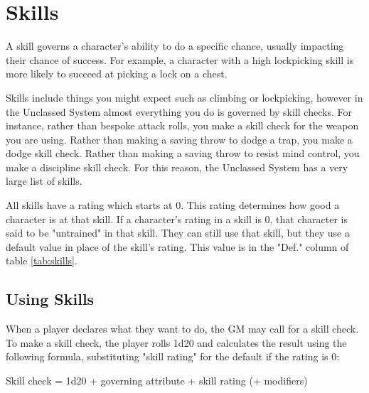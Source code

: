 \chapter{Skills}\label{skills}





\begin{multicols}{2}
    A skill governs a character's ability to do a specific chance, usually
    impacting their chance of success. For example, a character with a high
    lockpicking skill is more likely to succeed at picking a lock on a chest.

    Skills include things you might expect such as climbing or lockpicking,
    however in the Unclassed System almost everything you do is governed by
    skill checks. For instance, rather than bespoke attack rolls, you make
    a skill check for the weapon you are using. Rather than making a saving
    throw to dodge a trap, you make a dodge skill check. Rather than making
    a saving throw to resist mind control, you make a discipline skill check.
    For this reason, the Unclassed System has a very large list of skills.

    All skills have a rating which starts at 0. This rating determines how
    good a character is at that skill. If a character's rating in a skill is
    0, that character is said to be "untrained" in that skill. They can still
    use that skill, but they use a default value in place of the skill's
    rating. This value is in the "Def." column of table \ref{tab:skills}.

    \section{Using Skills}
    When a player declares what they want to do, the GM may call for a skill
    check. To make a skill check, the player rolls 1d20 and calculates the
    result using the following formula, substituting "skill rating" for the
    default if the rating is 0:

    \begin{center}
        Skill check = 1d20 + governing attribute + skill rating (+ modifiers)
    \end{center}


\end{multicols}
